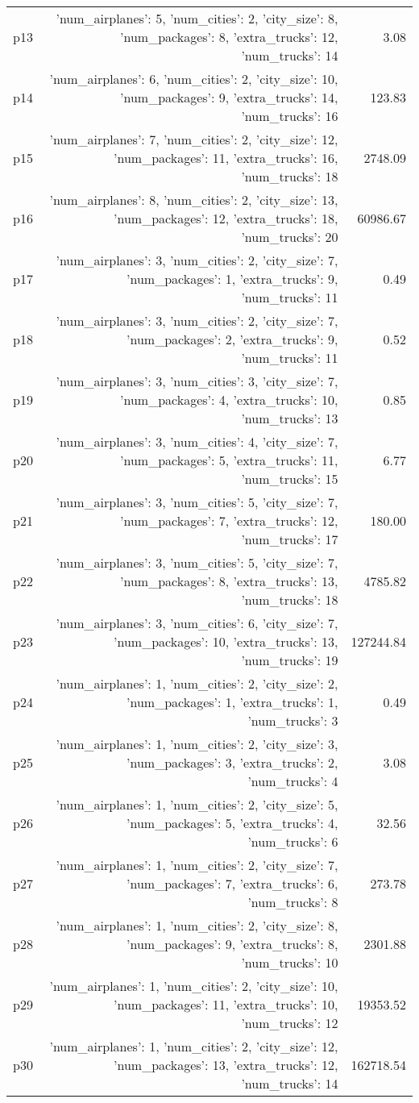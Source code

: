 \documentclass{article}
\begin{document}
\begin{center}
\begin{tabular}{@{}l|r|r@{}}
  p13&{'num\_airplanes': 5, 'num\_cities': 2, 'city\_size': 8, 'num\_packages': 8, 'extra\_trucks': 12, 'num\_trucks': 14}&3.08\\
  p14&{'num\_airplanes': 6, 'num\_cities': 2, 'city\_size': 10, 'num\_packages': 9, 'extra\_trucks': 14, 'num\_trucks': 16}&123.83\\
  p15&{'num\_airplanes': 7, 'num\_cities': 2, 'city\_size': 12, 'num\_packages': 11, 'extra\_trucks': 16, 'num\_trucks': 18}&2748.09\\
  p16&{'num\_airplanes': 8, 'num\_cities': 2, 'city\_size': 13, 'num\_packages': 12, 'extra\_trucks': 18, 'num\_trucks': 20}&60986.67\\
  p17&{'num\_airplanes': 3, 'num\_cities': 2, 'city\_size': 7, 'num\_packages': 1, 'extra\_trucks': 9, 'num\_trucks': 11}&0.49\\
  p18&{'num\_airplanes': 3, 'num\_cities': 2, 'city\_size': 7, 'num\_packages': 2, 'extra\_trucks': 9, 'num\_trucks': 11}&0.52\\
  p19&{'num\_airplanes': 3, 'num\_cities': 3, 'city\_size': 7, 'num\_packages': 4, 'extra\_trucks': 10, 'num\_trucks': 13}&0.85\\
  p20&{'num\_airplanes': 3, 'num\_cities': 4, 'city\_size': 7, 'num\_packages': 5, 'extra\_trucks': 11, 'num\_trucks': 15}&6.77\\
  p21&{'num\_airplanes': 3, 'num\_cities': 5, 'city\_size': 7, 'num\_packages': 7, 'extra\_trucks': 12, 'num\_trucks': 17}&180.00\\
  p22&{'num\_airplanes': 3, 'num\_cities': 5, 'city\_size': 7, 'num\_packages': 8, 'extra\_trucks': 13, 'num\_trucks': 18}&4785.82\\
  p23&{'num\_airplanes': 3, 'num\_cities': 6, 'city\_size': 7, 'num\_packages': 10, 'extra\_trucks': 13, 'num\_trucks': 19}&127244.84\\
  p24&{'num\_airplanes': 1, 'num\_cities': 2, 'city\_size': 2, 'num\_packages': 1, 'extra\_trucks': 1, 'num\_trucks': 3}&0.49\\
  p25&{'num\_airplanes': 1, 'num\_cities': 2, 'city\_size': 3, 'num\_packages': 3, 'extra\_trucks': 2, 'num\_trucks': 4}&3.08\\
  p26&{'num\_airplanes': 1, 'num\_cities': 2, 'city\_size': 5, 'num\_packages': 5, 'extra\_trucks': 4, 'num\_trucks': 6}&32.56\\
  p27&{'num\_airplanes': 1, 'num\_cities': 2, 'city\_size': 7, 'num\_packages': 7, 'extra\_trucks': 6, 'num\_trucks': 8}&273.78\\
  p28&{'num\_airplanes': 1, 'num\_cities': 2, 'city\_size': 8, 'num\_packages': 9, 'extra\_trucks': 8, 'num\_trucks': 10}&2301.88\\
  p29&{'num\_airplanes': 1, 'num\_cities': 2, 'city\_size': 10, 'num\_packages': 11, 'extra\_trucks': 10, 'num\_trucks': 12}&19353.52\\
  p30&{'num\_airplanes': 1, 'num\_cities': 2, 'city\_size': 12, 'num\_packages': 13, 'extra\_trucks': 12, 'num\_trucks': 14}&162718.54
                            \end{tabular}
                            \end{center}
                    
\end{document}

